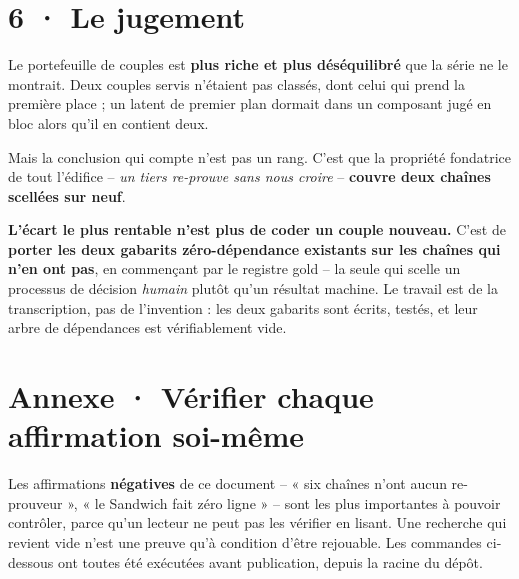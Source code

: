 \documentclass[10pt]{article}
\begin{document}
\section{6 · Le jugement}

Le portefeuille de couples est \textbf{plus riche et plus déséquilibré} que la série ne le montrait. Deux
couples servis n'étaient pas classés, dont celui qui prend la première place ; un latent de premier plan
dormait dans un composant jugé en bloc alors qu'il en contient deux.

Mais la conclusion qui compte n'est pas un rang. C'est que la propriété fondatrice de tout l'édifice --
\emph{un tiers re-prouve sans nous croire} -- \textbf{couvre deux chaînes scellées sur neuf}.

\begin{acquis}
\textbf{L'écart le plus rentable n'est plus de coder un couple nouveau.} C'est de \textbf{porter les deux
gabarits zéro-dépendance existants sur les chaînes qui n'en ont pas}, en commençant par le registre gold
-- la seule qui scelle un processus de décision \emph{humain} plutôt qu'un résultat machine. Le travail
est de la transcription, pas de l'invention : les deux gabarits sont écrits, testés, et leur arbre de
dépendances est vérifiablement vide.
\end{acquis}

\section{Annexe · Vérifier chaque affirmation soi-même}

Les affirmations \textbf{négatives} de ce document -- « six chaînes n'ont aucun re-prouveur », « le
Sandwich fait zéro ligne » -- sont les plus importantes à pouvoir contrôler, parce qu'un lecteur ne peut
pas les vérifier en lisant. Une recherche qui revient vide n'est une preuve qu'à condition d'être
rejouable. Les commandes ci-dessous ont toutes été exécutées avant publication, depuis la racine du
dépôt.
\end{document}
